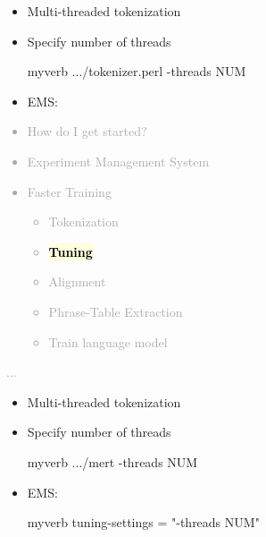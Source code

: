 \documentclass[landscape]{uedslides2C}
\newcommand{\currenttopic}[1]{\colorbox{lightyellow}{\textcolor{black}{\bf #1}}}
\begin{document}
\begin{itemize} \itemsep 10mm

\item Multi-threaded tokenization

\item {Specify number of threads}\\[4mm]
\begin{SaveVerbatim}{myverb} 
 .../tokenizer.perl -threads NUM
\end{SaveVerbatim}
\colorbox{gray}{}

\item EMS: \\[4mm]
\colorbox{gray}{}
  
  
\end{itemize}



\vspace{-5mm}
\textcolor{darkgrey}{
\begin{itemize} \itemsep -1mm
\item {How do I get started?}
\item {Experiment Management System}
\item {Faster Training}
  \begin{itemize}
  \item {Tokenization}
  \item \currenttopic{Tuning}
  \item Alignment
  \item Phrase-Table Extraction
  \item Train language model
  \end{itemize}
\end{itemize}
...
}


\vspace{10mm}
\begin{itemize} \itemsep 10mm
\item Multi-threaded tokenization

\item {Specify number of threads}\\[4mm]
\begin{SaveVerbatim}{myverb} 
  .../mert -threads NUM
\end{SaveVerbatim}
\colorbox{gray}{}

\item EMS:\\[4mm]
\begin{SaveVerbatim}{myverb} 
  tuning-settings = "-threads NUM" 
\end{SaveVerbatim}
\colorbox{gray}{}

\end{itemize}
\end{document}
